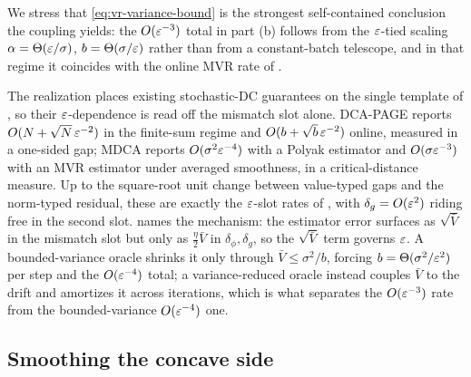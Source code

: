 We stress that \eqref{eq:vr-variance-bound} is the strongest self-contained
conclusion the coupling yields: the $O(\varepsilon^{-3})$ total in part (b) follows from
the $\varepsilon$-tied scaling $\alpha=\Theta(\varepsilon/\sigma)$, $b=\Theta(\sigma/\varepsilon)$
rather than from a constant-batch telescope, and in that regime it coincides with
the online MVR rate of \citet{chayti2025stochastic}.

\begin{remark}
\label{rem:vr-relationship}
The realization  places existing
stochastic-DC guarantees on the single template of ,
so their $\varepsilon$-dependence is read off the mismatch slot alone. DCA-PAGE
\citep{nguyen2025improved} reports $O(N+\sqrt N\,\varepsilon^{-2})$ in the finite-sum
regime and $O(b+\sqrt b\,\varepsilon^{-2})$ online, measured in a one-sided gap; MDCA
\citep{chayti2025stochastic} reports $O(\sigma^2\varepsilon^{-4})$ with a Polyak
estimator and $O(\sigma\varepsilon^{-3})$ with an MVR estimator under averaged
smoothness, in a critical-distance measure. Up to the square-root unit change
between value-typed gaps and the norm-typed residual, these are exactly the
$\varepsilon$-slot rates of , with
$\delta_g=O(\varepsilon^2)$ riding free in the second slot.  names
the mechanism: the estimator error surfaces as $\sqrt{\bar V}$ in the mismatch
slot but only as $\tfrac\eta2\bar V$ in $\delta_\phi,\delta_g$, so the
$\sqrt{\bar V}$ term governs $\varepsilon$. A bounded-variance oracle shrinks it only
through $\bar V\le\sigma^2/b$, forcing $b=\Theta(\sigma^2/\varepsilon^2)$ per step and
the $O(\varepsilon^{-4})$ total; a variance-reduced oracle instead couples $\bar V$ to
the drift and amortizes it across iterations, which is what separates the
$O(\varepsilon^{-3})$ rate from the bounded-variance $O(\varepsilon^{-4})$ one.
\end{remark}

\subsection{Smoothing the concave side}
\label{subsec:stoch-smoothing}

